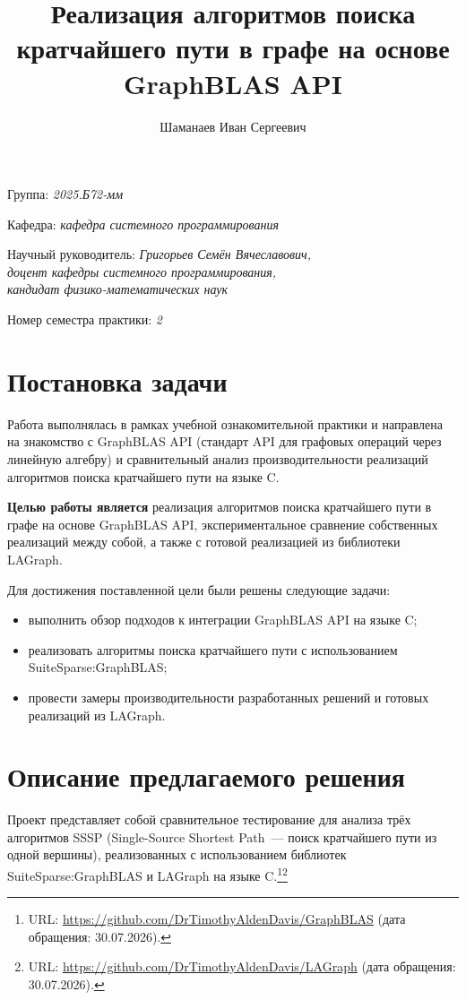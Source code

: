 \documentclass[a4paper]{article}
\title{Реализация алгоритмов поиска кратчайшего пути в графе на основе GraphBLAS API}
\author{Шаманаев Иван Сергеевич}
\date{}
\begin{document}
\maketitle

\begin{flushright}
    Группа: \emph{2025.Б72-мм}

    Кафедра: \emph{кафедра системного программирования}

    Научный руководитель: \emph{Григорьев Семён Вячеславович,}\\
    \emph{доцент кафедры системного программирования,}\\
    \emph{кандидат физико-математических наук}

    Номер семестра практики: \emph{2}
\end{flushright}


\section{Постановка задачи}
Работа выполнялась в рамках учебной ознакомительной практики и направлена на знакомство с GraphBLAS API (стандарт API для графовых операций через линейную алгебру) и сравнительный анализ производительности реализаций алгоритмов поиска кратчайшего пути на языке C.

\textbf{Целью работы является} реализация алгоритмов поиска кратчайшего пути в графе на основе GraphBLAS API, экспериментальное сравнение собственных реализаций между собой, а также с готовой реализацией из библиотеки LAGraph.

Для достижения поставленной цели были решены следующие задачи:
\begin{itemize}
    \item выполнить обзор подходов к интеграции GraphBLAS API на языке C;
    \item реализовать алгоритмы поиска кратчайшего пути с использованием SuiteSparse:GraphBLAS;
    \item провести замеры производительности разработанных решений и готовых реализаций из LAGraph.
\end{itemize}
\section{Описание предлагаемого решения}

Проект представляет собой сравнительное тестирование для анализа трёх алгоритмов SSSP (Single-Source Shortest Path~--- поиск кратчайшего пути из одной вершины), реализованных с использованием библиотек SuiteSparse:GraphBLAS и LAGraph на языке C.\footnote{URL: \url{https://github.com/DrTimothyAldenDavis/GraphBLAS} (дата обращения: 30.07.2026).}\footnote{URL: \url{https://github.com/DrTimothyAldenDavis/LAGraph} (дата обращения: 30.07.2026).}
\end{document}
